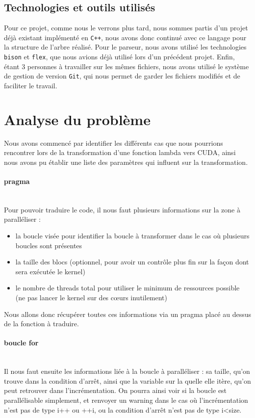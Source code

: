 \documentclass{article}
\begin{document}
	\subsection{Technologies et outils utilisés}
	
	Pour ce projet, comme nous le verrons plus tard, nous sommes partis d'un projet déjà existant implémenté en \verb|C++|, nous avons donc continué avec ce langage pour la structure de l'arbre réalisé.
	Pour le parseur, nous avons utilisé les technologies \verb|bison| et \verb|flex|, que nous avions déjà utilisé lors d'un précédent projet.
	Enfin, étant 3 personnes à travailler sur les mêmes fichiers, nous avons utilisé le système de gestion de version \verb|Git|, qui nous permet de garder les fichiers modifiés et de faciliter le travail.
	
	\newpage	
	
	\section{Analyse du problème}
	Nous avons commencé par identifier les différents cas que nous pourrions rencontrer lors de la transformation d'une fonction lambda vers CUDA, ainsi nous avons pu établir une liste des paramètres qui influent sur la transformation.
	
	\paragraph{pragma}
	~~\\
	\indent
	Pour pouvoir traduire le code, il nous faut plusieurs informations sur la zone à paralléliser : 
	\begin{itemize}
		\item la boucle visée pour identifier la boucle à transformer dans le cas où plusieurs boucles sont présentes
		\item la taille des blocs (optionnel, pour avoir un contrôle plus fin sur la façon dont sera exécutée le kernel)
		\item le nombre de threads total pour utiliser le minimum de ressources possible (ne pas lancer le kernel sur des cœurs inutilement)
	\end{itemize}		
	Nous allons donc récupérer toutes ces informations via un pragma placé au dessus de la fonction à traduire.
	
	\paragraph{boucle for}
	~~\\
	\indent
	Il nous faut ensuite les informations liée à la boucle à paralléliser : sa taille, qu'on trouve dans la condition d'arrêt, ainsi que la variable sur la quelle elle itère, qu'on peut retrouver dans l'incrémentation. On pourra ainsi voir si la boucle est parallélisable simplement, et renvoyer un warning dans le cas où l'incrémentation n'est pas de type i++ ou ++i, ou la condition d'arrêt n'est pas de type i\textless size.	
	
\end{document}
